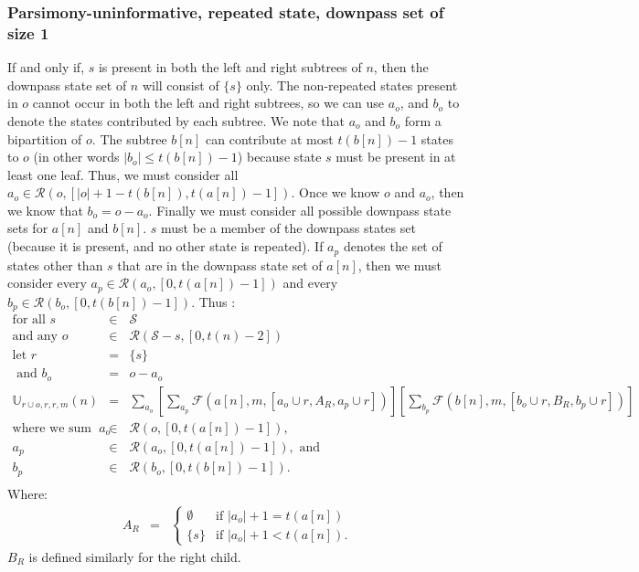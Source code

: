 \documentclass[11pt]{article}
\newcommand{\allStates}{\ensuremath{\mathcal S}\xspace}
\newcommand{\probUninformPatClassSym}{\ensuremath{\mathbb U}\xspace}
\newcommand{\probUninformPatClass}[5]{\ensuremath{\probUninformPatClassSym_{#1,#2,#3,#4}\left(#5\right)}\xspace}
\newcommand{\leftChild}[1]{\ensuremath{a\left[#1\right]}\xspace} %
\newcommand{\rightChild}[1]{\ensuremath{b\left[#1\right]}\xspace}%
\newcommand{\numLeaves}[1]{\ensuremath{t\left(#1\right)}\xspace}
\newcommand{\subsetsOfSizeSet}[3]{\ensuremath{\mathcal R}\left(#1,\left[#2,#3\right]\right)\xspace}
\newcommand{\FelsensteinPruneSym}{{\mathcal{F}}}
\newcommand{\FelsensteinPruneUninform}[5]{\FelsensteinPruneSym(#1,#2,\left[#3,#4,#5\right])}
\begin{document}
\subsubsection{Parsimony-uninformative, repeated state, downpass set of size 1}
If and only if, $s$ is present in both the left and right subtrees of $n$, then the downpass state set of $n$ will consist of $\{s\}$ only.
The non-repeated states present in $o$ cannot occur in both the left and right subtrees, so we can use $a_o$, and $b_o$ to denote the states contributed by each subtree. We note that $a_o$ and $b_o$ form a bipartition of $o$.
The subtree $\rightChild{n}$ can contribute at most $\numLeaves{\rightChild{n}}-1$ states to $o$ (in other words $|b_o| \leq \numLeaves{\rightChild{n}}-1$) because state $s$ must be present in at least one leaf.
Thus, we must consider all $a_o\in\subsetsOfSizeSet{o}{|o| +1 - \numLeaves{\rightChild{n}} }{\numLeaves{\leftChild{n}}-1}$.
Once we know $o$ and $a_o$, then we know that $b_o = o - a_o$.
Finally we must consider all possible downpass state sets for $\leftChild{n}$ and $\rightChild{n}$.
$s$ must be a member of the downpass states set (because it is present, and no other state is repeated).
If $a_{p}$ denotes the set of states other than $s$ that are in the downpass state set of $\leftChild{n}$, then we must consider every 
$a_p\in\subsetsOfSizeSet{a_o}{0}{\numLeaves{\leftChild{n}}-1}$ and every $b_p\in\subsetsOfSizeSet{b_o}{0}{\numLeaves{\rightChild{n}}-1}$. 
Thus :
\begin{eqnarray*}
\mbox{for all } s & \in &  \allStates\\
\mbox{and any } o & \in &  \subsetsOfSizeSet{\allStates-s}{0}{\numLeaves{n}-2}\\
\mbox{let }r & =&  \{s\}   \nonumber \\
\mbox{ and } b_o & = & o - a_o \\
\probUninformPatClass{r\cup o}{r}{r}{m}{n} &= & \sum_{a_o}\left[\sum_{a_p}\FelsensteinPruneUninform{\leftChild{n}}{m}{a_o\cup r}{A_R}{a_p\cup r} \right]\left[\sum_{b_p}\FelsensteinPruneUninform{\rightChild{n}}{m}{b_o\cup r}{B_R}{b_p \cup r} \right]\nonumber\\
\mbox{where we sum for all } a_o & \in &  \subsetsOfSizeSet{o}{0}{\numLeaves{\leftChild{n}}-1},\\
 a_p & \in &  \subsetsOfSizeSet{a_o}{0}{\numLeaves{\leftChild{n}}-1}, \mbox{ and}\\
 b_p & \in &  \subsetsOfSizeSet{b_o}{0}{\numLeaves{\rightChild{n}}-1}.\\
\end{eqnarray*}
Where: 
\begin{eqnarray*} 
	A_R & = & \left\{\begin{array}{ll}
		\emptyset &  \mbox{if } |a_o| + 1 = \numLeaves{\leftChild{n}}\\
		\{s\} &  \mbox{if } |a_o| + 1 < \numLeaves{\leftChild{n}}.
	\end{array} \right.
\end{eqnarray*} 
$B_R$ is defined similarly for the right child.
\end{document}
